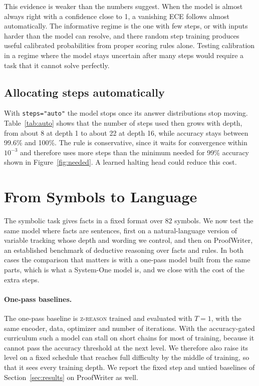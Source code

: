 \documentclass{article}
\newcommand{\zr}{\textsc{z-reason}}
\begin{document}
This evidence is weaker than the numbers suggest. When the model is almost always right with a confidence close to 1, a vanishing ECE follows almost automatically. The informative regime is the one with few steps, or with inputs harder than the model can resolve, and there random step training produces useful calibrated probabilities from proper scoring rules alone. Testing calibration in a regime where the model stays uncertain after many steps would require a task that it cannot solve perfectly.

\subsection{Allocating steps automatically}

\begin{table}[t]
\centering
\small
\caption{Behavior of \texttt{steps="auto"} by depth, averaged over seeds, showing the mean number of steps used before the halting rule fires and the accuracy over all question types.}
\label{tab:auto}

\end{table}

With \texttt{steps="auto"} the model stops once its answer distributions stop moving. Table~\ref{tab:auto} shows that the number of steps used then grows with depth, from about 8 at depth 1 to about 22 at depth 16, while accuracy stays between 99.6\% and 100\%. The rule is conservative, since it waits for convergence within $10^{-3}$ and therefore uses more steps than the minimum needed for 99\% accuracy shown in Figure~\ref{fig:needed}. A learned halting head could reduce this cost.

\section{From Symbols to Language}
\label{sec:language}

The symbolic task gives facts in a fixed format over 82 symbols. We now test the same model where facts are sentences, first on a natural-language version of variable tracking whose depth and wording we control, and then on ProofWriter, an established benchmark of deductive reasoning over facts and rules. In both cases the comparison that matters is with a one-pass model built from the same parts, which is what a System-One model is, and we close with the cost of the extra steps.

\paragraph{One-pass baselines.} The one-pass baseline is \zr{} trained and evaluated with $T = 1$, with the same encoder, data, optimizer and number of iterations. With the accuracy-gated curriculum such a model can stall on short chains for most of training, because it cannot pass the accuracy threshold at the next level. We therefore also raise its level on a fixed schedule that reaches full difficulty by the middle of training, so that it sees every training depth. We report the fixed step and untied baselines of Section~\ref{sec:results} on ProofWriter as well.
\end{document}
